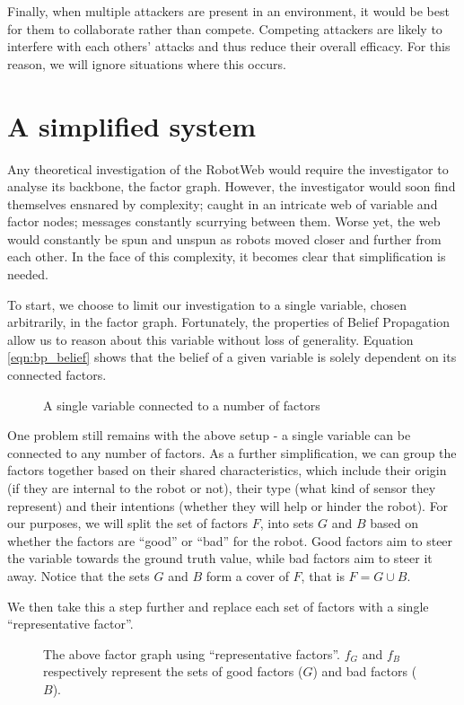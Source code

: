 Finally, when multiple attackers are present in an environment, it would be best for them to collaborate rather than compete. Competing attackers are likely to interfere with each others' attacks and thus reduce their overall efficacy. For this reason, we will ignore situations where this occurs.


\section{A simplified system}
Any theoretical investigation of the RobotWeb would require the investigator to analyse its backbone, the factor graph. However, the investigator would soon find themselves ensnared by complexity; caught in an intricate web of variable and factor nodes; messages constantly scurrying between them. Worse yet, the web would constantly be spun and unspun as robots moved closer and further from each other. In the face of this complexity, it becomes clear that simplification is needed.

To start, we choose to limit our investigation to a single variable, chosen arbitrarily, in the factor graph. Fortunately, the properties of Belief Propagation allow us to reason about this variable without loss of generality. Equation \ref{eqn:bp_belief} shows that the belief of a given variable is solely dependent on its connected factors. 

\begin{figure}[!h]
	\centering
	

	\caption[Single Variable in a Factor Graph]{A single variable connected to a number of factors}
\end{figure}

One problem still remains with the above setup - a single variable can be connected to any number of factors. As a further simplification, we can group the factors together based on their shared characteristics, which include their origin (if they are internal to the robot or not), their type (what kind of sensor they represent) and their intentions (whether they will help or hinder the robot). For our purposes, we will split the set of factors $F$, into sets $G$ and $B$ based on whether the factors are ``good'' or ``bad'' for the robot. Good factors aim to steer the variable towards the ground truth value, while bad factors aim to steer it away. Notice that the sets $G$ and $B$ form a cover of $F$, that is $F = G \cup B$.

We then take this a step further and replace each set of factors with a single ``representative factor''.
\begin{figure}[!ht]
	\centering
	

	\caption[Representative factor graph around a single variable]{The above factor graph using ``representative factors''. $f_G$ and $f_B$ respectively represent the sets of good factors ($G$) and bad factors ($B$).}
\end{figure}


